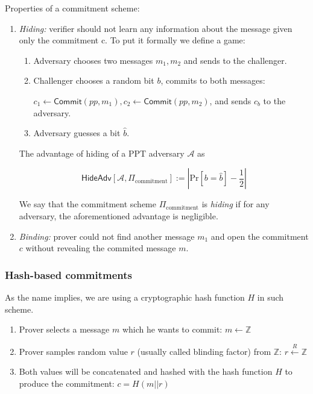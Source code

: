 \documentclass[../lecture-notes.tex]{subfiles}
\begin{document}
\begin{definition}
    Properties of a commitment scheme:
    \begin{enumerate}
        \item \textit{Hiding: } verifier should not learn any information about the message given only the commitment c. To put it formally we define a game:
        \begin{enumerate}
            \item Adversary chooses two messages $m_1,m_2$ and sends to the challenger.
            \item Challenger chooses a random bit $b$, commits to both messages: 
            
                $c_1 \gets \mathsf{Commit}(pp, m_1), c_2 \gets \mathsf{Commit}(pp,m_2)$, and sends $c_b$ to the adversary.
            \item Adversary guesses a bit $\hat{b}$.
        \end{enumerate}
        
        The advantage of hiding of a PPT adversary $\mathcal{A}$ as 
        
        $$
        \mathsf{HideAdv}[\mathcal{A}, \Pi_{\text{commitment}}] := \left| \text{Pr}[b=\hat{b}] - \frac{1}{2} \right|
        $$
        
        We say that the commitment scheme $\Pi_{\text{commitment}}$ is \textit{hiding} if for any adversary, the aforementioned advantage is negligible.
        
        \item \textit{Binding: } prover could not find another message $m_1$ and open the commitment $c$ without revealing the commited message $m$.
    \end{enumerate}
\end{definition}

\subsubsection{Hash-based commitments}

As the name implies, we are using a cryptographic hash function \(H\) in such scheme.

\begin{enumerate}
    \item Prover selects a message $m$ which he wants to commit:
        $m \leftarrow \mathbb{Z}$

    \item Prover samples random value $r$ (usually called blinding factor) from $\mathbb{Z}$:
        $r \xleftarrow{R} \mathbb{Z}$
    
    \item Both values will be concatenated and hashed with the hash function $H$ to produce the commitment:
        $c = H(m || r)$

\end{enumerate}
\end{document}
